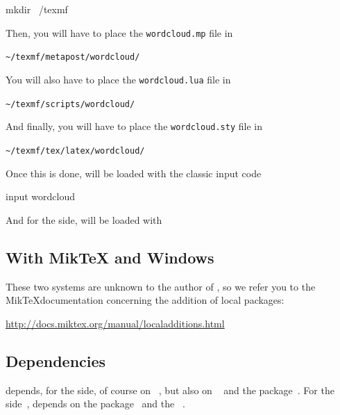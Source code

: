 \documentclass[english]{ltxdoc}
\begin{document}
\begin{commandshell}
mkdir ~/texmf
\end{commandshell}

Then, you will have to place the \lstinline+wordcloud.mp+ file in 
\begin{center}
  \verb+~/texmf/metapost/wordcloud/+
\end{center}


You will also have to place the \lstinline+wordcloud.lua+ file in 
\begin{center}
  \verb+~/texmf/scripts/wordcloud/+
\end{center}

And finally, you will have to place the \lstinline+wordcloud.sty+ file in 
\begin{center}
  \verb+~/texmf/tex/latex/wordcloud/+
\end{center}



Once this is done, \wordcloudpkg will be loaded with the classic \MP{}
input code
\begin{mpcode}
input wordcloud
\end{mpcode}

And for the  side, \wordcloudpkg will be loaded with
\begin{latexcode}
\usepackage{wordcloud}
\end{latexcode}

\subsection{With Mik\TeX{} and Windows}

These two systems are unknown to the author of \wordcloudpkg, so we
refer you to the Mik\TeX documentation concerning the addition of local packages:
\begin{center}
  \url{http://docs.miktex.org/manual/localadditions.html}
\end{center}



\subsection{Dependencies}


\wordcloudpkg depends, for the \MP side, of course on \MP~\cite{ctan-metapost},
but also on ~\cite{ctan-metapost-colorbrewer} and the
 package~\cite{ctan-latexmp}. For the  side~\cite{ctan-lualatex-doc},
\wordcloudpkg depends on  the  package~\cite{ctan-luamplib}
and the ~\cite{ctan-xcolor}.
\end{document}
